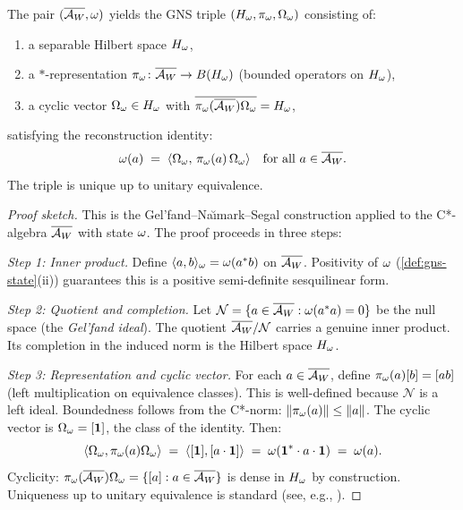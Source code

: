 \begin{theorem}
\label{thm:gns-representation}
The pair $(\overline{\mathcal{A}_W}, \omega)$ yields the GNS triple
$(H_\omega, \pi_\omega, \Omega_\omega)$ consisting of:
\begin{enumerate}[nosep, label=(\alph*)]
  \item a separable Hilbert space $H_\omega$,
  \item a $*$-representation $\pi_\omega \colon \overline{\mathcal{A}_W} \to B(H_\omega)$
        (bounded operators on $H_\omega$),
  \item a cyclic vector $\Omega_\omega \in H_\omega$ with
        $\overline{\pi_\omega(\overline{\mathcal{A}_W})\Omega_\omega} = H_\omega$,
\end{enumerate}
satisfying the reconstruction identity:
\[
  \omega(a) \;=\;
  \langle \Omega_\omega,\, \pi_\omega(a)\, \Omega_\omega \rangle
  \quad \text{for all } a \in \overline{\mathcal{A}_W}.
\]
The triple is unique up to unitary equivalence.

\begin{proof}[Proof sketch]
This is the Gel'fand--Na\u{\i}mark--Segal construction applied to the
C*-algebra $\overline{\mathcal{A}_W}$ with state $\omega$.  The proof proceeds in three
steps:

\emph{Step 1: Inner product.}
Define $\langle a, b \rangle_\omega = \omega(a^* b)$ on $\overline{\mathcal{A}_W}$.
Positivity of $\omega$ (\cref{def:gns-state}(ii)) guarantees this is a
positive semi-definite sesquilinear form.

\emph{Step 2: Quotient and completion.}
Let $\mathcal{N} = \{a \in \overline{\mathcal{A}_W} : \omega(a^* a) = 0\}$ be the null
space (the \emph{Gel'fand ideal}).  The quotient $\overline{\mathcal{A}_W} / \mathcal{N}$
carries a genuine inner product.  Its completion in the induced norm is
the Hilbert space $H_\omega$.

\emph{Step 3: Representation and cyclic vector.}
For each $a \in \overline{\mathcal{A}_W}$, define $\pi_\omega(a)[b] = [ab]$ (left
multiplication on equivalence classes).  This is well-defined because
$\mathcal{N}$ is a left ideal.  Boundedness follows from the C*-norm:
$\|\pi_\omega(a)\| \leq \|a\|$.  The cyclic vector is
$\Omega_\omega = [\mathbf{1}]$, the class of the identity.  Then:
\[
  \langle \Omega_\omega, \pi_\omega(a) \Omega_\omega \rangle
  \;=\; \langle [\mathbf{1}], [a \cdot \mathbf{1}] \rangle
  \;=\; \omega(\mathbf{1}^* \cdot a \cdot \mathbf{1})
  \;=\; \omega(a).
\]
Cyclicity: $\pi_\omega(\overline{\mathcal{A}_W})\Omega_\omega = \{[a] : a \in \overline{\mathcal{A}_W}\}$ is dense
in $H_\omega$ by construction.  Uniqueness up to unitary equivalence is
standard (see, e.g., \citealt{bratteli1987}).

\end{proof}
\end{theorem}

